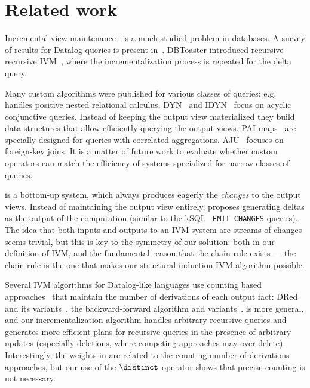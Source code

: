 \section{Related work}\label{sec:related}

Incremental view maintenance~\cite{gupta-sigmod93, griffin-sigmod95,
  chaudhuri-icde95, gupta-idb95, chirkova-book12} is a much studied
problem in databases.  A survey of results for Datalog queries is
present in~\cite{motik-ai19}.  DBToaster introduced recursive
recursive IVM~\cite{ahmad-vldb09, koch-pods10}, where the
incrementalization process is repeated for the delta query.

Many custom algorithms were published for various classes of queries:
e.g.~\cite{koch-pods16} handles positive nested relational calculus.
DYN~\cite{idris-sigmod17} and IDYN~\cite{idris-vldb18, idris-sigmod19}
focus on acyclic conjunctive queries.  Instead of keeping the output
view materialized they build data structures that allow efficiently
querying the output views.  PAI maps~\cite{abeysinghe-sigmod22} are
specially designed for queries with correlated aggregations.
AJU~\cite{wang-sigmod20} focuses on foreign-key joins.  It is a matter
of future work to evaluate whether custom \dbsp operators can match
the efficiency of systems specialized for narrow classes of queries.

\dbsp is a bottom-up system, which always produces eagerly the
\emph{changes} to the output views.  Instead of maintaining the output
view entirely, \dbsp proposes generating deltas as the output of the
computation (similar to the kSQL~\cite{jafarpour-edbt19} \texttt{EMIT
  CHANGES} queries).  The idea that both inputs and outputs to an IVM
system are streams of changes seems trivial, but this is key to the
symmetry of our solution: both in our definition of IVM, and the
fundamental reason that the chain rule exists --- the chain rule is
the one that makes our structural induction IVM algorithm possible.

Several IVM algorithms for Datalog-like languages use counting based
approaches~\cite{Dewan-iis92,motik-aaai15} that maintain the number of derivations of each
output fact: DRed~\cite{gupta-sigmod93} and its variants~\cite{Ceri-VLDB91,Wolfson-sigmod91,
Staudt-vldb96,Kotowski-rr11,Lu-sigmod95,Apt-sigmod87}, the backward-forward algorithm
and variants~\cite{motik-aaai15,Harrison-wdd92,motik-ai19}.
\dbsp is more general,
and our incrementalization algorithm handles arbitrary recursive queries and
generates more efficient plans for recursive queries
in the presence of arbitrary updates (especially deletions, where competing approaches
may over-delete).  Interestingly, the \zrs weights in \dbsp are related
to the counting-number-of-derivations approaches, but our use of the $\distinct$
operator shows that precise counting is not necessary.

